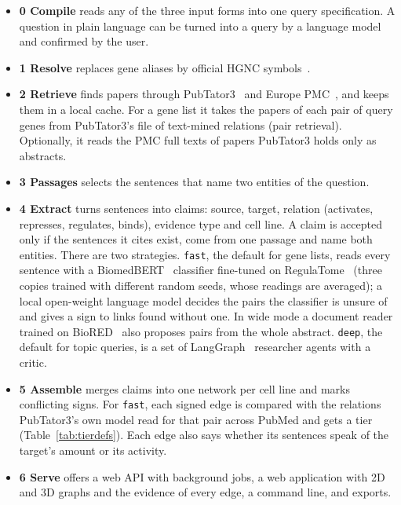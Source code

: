 \documentclass[11pt,a4paper]{article}
\newcommand{\code}[1]{\texttt{#1}}
\begin{document}
\begin{itemize}
  \item \textbf{0 Compile} reads any of the three input forms into one query specification.
    A question in plain language can be turned into a query by a language model and confirmed by
    the user.
  \item \textbf{1 Resolve} replaces gene aliases by official HGNC symbols~\cite{hgnc}.
  \item \textbf{2 Retrieve} finds papers through PubTator3~\cite{pubtator3} and Europe
    PMC~\cite{europepmc}, and keeps them in a local cache. For a gene list it takes the papers of
    each pair of query genes from PubTator3's file of text-mined relations (pair retrieval).
    Optionally, it reads the PMC full texts of papers PubTator3 holds only as abstracts.
  \item \textbf{3 Passages} selects the sentences that name two entities of the question.
  \item \textbf{4 Extract} turns sentences into claims: source, target, relation (activates,
    represses, regulates, binds), evidence type and cell line. A claim is accepted only if the
    sentences it cites exist, come from one passage and name both entities. There are two
    strategies. \code{fast}, the default for gene lists, reads every sentence with a
    BiomedBERT~\cite{biomedbert} classifier fine-tuned on RegulaTome~\cite{regulatome} (three
    copies trained with different random seeds, whose readings are averaged); a local
    open-weight language model decides the pairs the classifier is unsure of and gives a sign to
    links found without one. In wide mode a document reader trained on BioRED~\cite{biored} also
    proposes pairs from the whole abstract. \code{deep}, the default for topic queries, is a set of
    LangGraph~\cite{langgraph} researcher agents with a critic.
  \item \textbf{5 Assemble} merges claims into one network per cell line and marks conflicting
    signs. For \code{fast}, each signed edge is compared with the relations PubTator3's own model
    read for that pair across PubMed and gets a tier (Table~\ref{tab:tierdefs}). Each edge also
    says whether its sentences speak of the target's amount or its activity.
  \item \textbf{6 Serve} offers a web API with background jobs, a web application with 2D and 3D
    graphs and the evidence of every edge, a command line, and exports.
\end{itemize}
\end{document}
